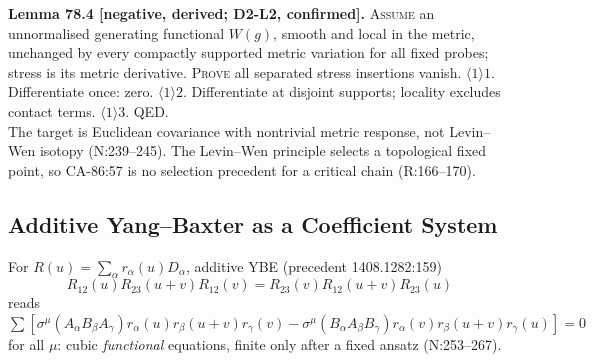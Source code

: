 \textbf{Lemma 78.4 [negative, derived; D2-L2, confirmed].}  \textsc{Assume} an unnormalised
generating functional \(W(g)\), smooth and local in the metric, unchanged by every compactly
supported metric variation for all fixed probes; stress is its metric derivative. \textsc{Prove} all
separated stress insertions vanish. \(\langle1\rangle1\). Differentiate once: zero.
\(\langle1\rangle2\). Differentiate at disjoint supports; locality excludes contact terms.
\(\langle1\rangle3\). QED.\\ The target is Euclidean covariance with nontrivial metric response, not
Levin--Wen isotopy (N:239--245).  The Levin--Wen principle selects a topological fixed point, so
CA-86:57 is no selection precedent for a critical chain (R:166--170).

\subsection{Additive Yang--Baxter as a Coefficient System}

For \(R(u)=\sum_\alpha r_\alpha(u)D_\alpha\), additive YBE (precedent 1408.1282:159)
\begin{equation}
  R_{12}(u)R_{23}(u{+}v)R_{12}(v)=R_{23}(v)R_{12}(u{+}v)R_{23}(u)
  \tag{78.2}
\end{equation}
reads \(\sum[\sigma^\mu(A_\alpha B_\beta A_\gamma)r_\alpha(u)r_\beta(u{+}v)r_\gamma(v)-
\sigma^\mu(B_\alpha A_\beta B_\gamma)r_\alpha(v)r_\beta(u{+}v)r_\gamma(u)]=0\) for all \(\mu\):
cubic \emph{functional} equations, finite only after a fixed ansatz (N:253--267).

